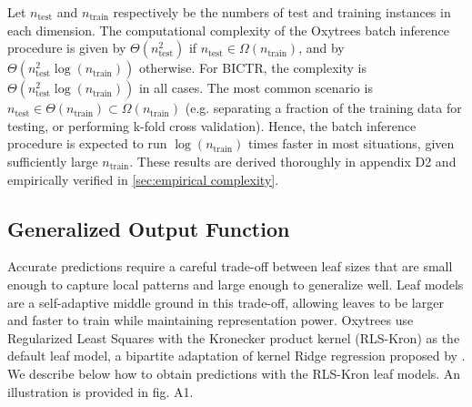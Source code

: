 \documentclass[letterpaper]{article}
\begin{document}
Let $n_\text{test}$ and $n_\text{train}$ respectively be the numbers of test and training instances in each dimension.
The computational complexity of the Oxytrees batch inference procedure is given by
$\Theta(n_\text{test}^2)$ if $n_\text{test} \in \Omega(n_\text{train})$, and by $\Theta(n^2_\text{test} \log(n_\text{train}))$ otherwise.
%
%
For BICTR, the complexity is $\Theta(n^2_\text{test} \log(n_\text{train}))$ in all cases.
The most common scenario is $n_\text{test} \in \Theta(n_\text{train}) \subset \Omega(n_\text{train})$ (e.g. separating a fraction of the training data for testing, or performing k-fold cross validation). Hence, the batch inference procedure is expected to run $\log (n_\text{train})$ times faster in most situations, given sufficiently large $n_\text{train}$.
These results are derived thoroughly in
appendix D2
and empirically verified in \cref{sec:empirical complexity}.


\subsection{Generalized Output Function}
\label{sec:paulownias output function}

Accurate predictions require a careful trade-off between leaf sizes that are small enough to capture local patterns and large enough to generalize well.
Leaf models are a self-adaptive middle ground in this trade-off, allowing leaves to be larger and faster to train while maintaining representation power.
Oxytrees use Regularized Least Squares with the Kronecker product kernel (RLS-Kron) as the default leaf model, a bipartite adaptation of kernel Ridge regression proposed by \citet{van_laarhoven_gaussian_2011}.
We describe below how to obtain predictions with the RLS-Kron leaf models. An illustration is provided in
fig. A1.
\end{document}
